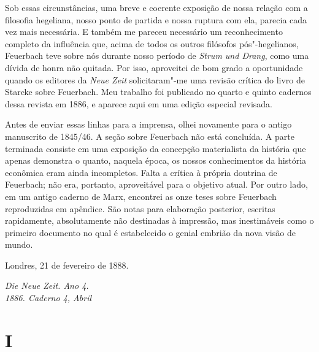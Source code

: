 Sob essas circunstâncias, uma breve e coerente exposição de nossa
relação com a filosofia hegeliana, nosso ponto de partida e nossa
ruptura com ela, parecia cada vez mais necessária. E também me pareceu
necessário um reconhecimento completo da influência que, acima de todos
os outros filósofos pós"-hegelianos, Feuerbach teve sobre nós durante
nosso período de \emph{Strum und Drang}, como uma dívida de honra não %
quitada. Por isso, aproveitei de bom grado a oportunidade quando os
editores da \emph{Neue Zeit} solicitaram"-me uma revisão crítica do
livro de Starcke sobre Feuerbach. Meu trabalho foi publicado no quarto e
quinto cadernos dessa revista em 1886, e aparece aqui em uma edição
especial revisada.

Antes de enviar essas linhas para a imprensa, olhei novamente para o antigo
manuscrito de 1845/46. A seção sobre Feuerbach não está
concluída. A parte terminada consiste em uma exposição da concepção
materialista da história que apenas demonstra o quanto, naquela época,
os nossos conhecimentos da história econômica eram ainda incompletos.
Falta a crítica à própria doutrina de Feuerbach; não era, portanto,
aproveitável para o objetivo atual. Por outro lado, em um antigo caderno
de Marx, encontrei as onze teses sobre Feuerbach reproduzidas em
apêndice. São notas para elaboração posterior, escritas rapidamente,
absolutamente não destinadas à impressão, mas inestimáveis ​​como o
primeiro documento no qual é estabelecido o genial embrião da nova
visão de mundo.

\bigskip

\hfill{}Londres, 21 de fevereiro de 1888. 

\quebra

\begin{flushright}
\emph{Die Neue Zeit. Ano 4.}\\
\emph{1886. Caderno 4, Abril} %
\end{flushright}

\vspace{2cm}


\section{I}


